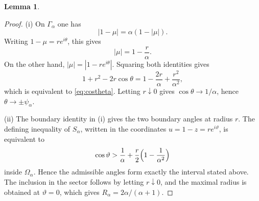 \documentclass[11pt]{amsart}
\numberwithin{equation}{section}
\newtheorem{lemma}[theorem]{Lemma}
\theoremstyle{definition}
\theoremstyle{plain}
\begin{document}
\begin{lemma}
\begin{enumerate}[label=\textnormal{(\roman*)}]
\end{enumerate}
\end{lemma}

\begin{proof}
(i) On \(\Gamma_\alpha\) one has
\[
        |1-\mu|=\alpha(1-|\mu|).
\]
Writing \(1-\mu=r e^{i\theta}\), this gives
\[
        |\mu|=1-\frac r\alpha .
\]
On the other hand, \(|\mu|=|1-r e^{i\theta}|\).  Squaring both identities gives
\[
        1+r^2-2r\cos\theta
        =
        1-\frac{2r}{\alpha}+\frac{r^2}{\alpha^2},
\]
which is equivalent to \eqref{eq:costheta}.  Letting \(r\downarrow0\) gives
\(\cos\theta\to1/\alpha\), hence \(\theta\to\pm\psi_\alpha\).

(ii) The boundary identity in (i) gives the two boundary angles at radius
\(r\).  The defining inequality of \(S_\alpha\), written in the coordinates
\(u=1-z=re^{i\vartheta}\), is equivalent to
\[
        \cos\vartheta
        >
        \frac1\alpha+\frac r2\Bigl(1-\frac1{\alpha^2}\Bigr)
\]
inside \(\Omega_\alpha\).  Hence the admissible angles form exactly the
interval stated above.  The inclusion in the sector follows by letting
\(r\downarrow0\), and the maximal radius is obtained at \(\vartheta=0\),
which gives \(R_\alpha=2\alpha/(\alpha+1)\).


\end{proof}
\end{document}
